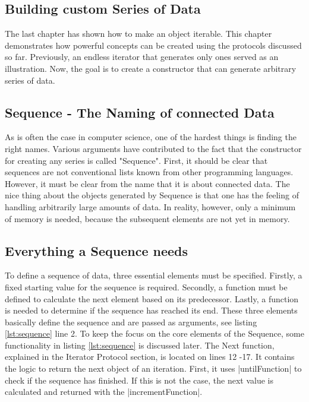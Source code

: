 \subsection{Building custom Series of Data}
\label{sub:Building custom Series of Data}
The last chapter has shown how to make an object iterable. This chapter 
demonstrates how powerful concepts can be created using the protocols 
discussed so far. Previously, an endless iterator that generates only ones 
served as an illustration. Now, the goal is to create a constructor that can 
generate arbitrary series of data.

\subsection{Sequence - The Naming of connected Data}
\label{sub:Sequence - The Naming of connected Data}
As is often the case in computer science, one of the hardest things is finding 
the right names. Various arguments have contributed to the fact that the 
constructor for creating any series is called "Sequence". First, it should be 
clear that sequences are not conventional lists known from other programming 
languages. However, it must be clear from the name that it is about connected 
data. The nice thing about the objects generated by Sequence is that one has 
the feeling of handling arbitrarily large amounts of data. In reality, however, 
only a minimum of memory is needed, because the subsequent elements are not yet 
in memory.

\subsection{Everything a Sequence needs}
\label{sub:Everything a Sequence needs}
To define a sequence of data, three essential elements must be specified. 
Firstly, a fixed starting value for the sequence is required. Secondly, a 
function must be defined to calculate the next element based on its predecessor. 
Lastly, a function is needed to determine if the sequence has reached its end.
These three elements basically define the sequence and are passed as arguments, 
see listing \ref{lst:sequence} line 2.
To keep the focus on the core elements of the Sequence, some functionality in 
listing \ref{lst:sequence} is discussed later. The Next function, explained in 
the Iterator Protocol section, is located on lines 12 -17. It contains the 
logic to return the next object of an iteration. First, it uses |untilFunction| 
to check if the sequence has finished. If this is not the case, the next value 
is calculated and returned with the |incrementFunction|.

